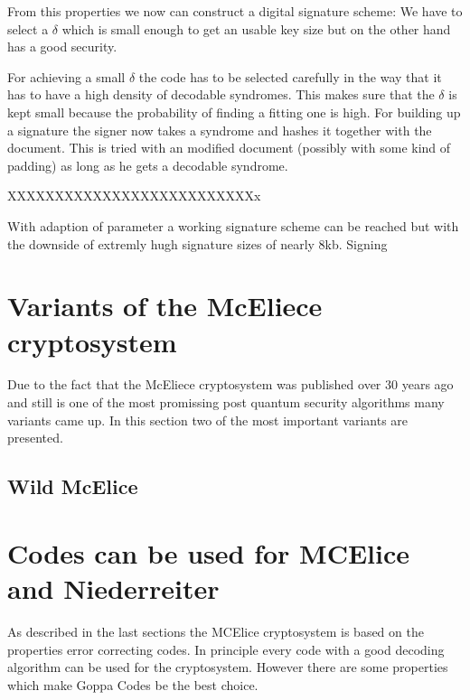 From this properties we now can construct a digital signature scheme: We have to select a $\delta$ which is small enough to get an usable key size but on the other hand has a good security. 

For achieving a small $\delta$ the code has to be selected carefully in the way that it has to have a high density of decodable syndromes. This makes sure that the $\delta$ is kept small because the probability of finding a fitting one is high. For building up a signature the signer now takes a syndrome and hashes it together with the document. This is tried with an modified document (possibly with some kind of padding) as long as he gets a decodable syndrome. 


XXXXXXXXXXXXXXXXXXXXXXXXXXx

With adaption of parameter a working signature scheme can be reached but with the downside of extremly hugh signature sizes of nearly 8kb. 
Signing

\section{Variants of the McEliece cryptosystem}
Due to the fact that the McEliece cryptosystem was published over 30 years ago and still is one of the most promissing post quantum security algorithms many variants came up. In this section two of the most important variants are presented. 
 

\subsection{Wild McElice}




\section{Codes can be used for MCElice and Niederreiter} 
As described in the last sections the MCElice cryptosystem is based on the properties error correcting codes. In principle every code with a good decoding algorithm can be used for the cryptosystem. However there are some properties which make Goppa Codes be the best choice.

